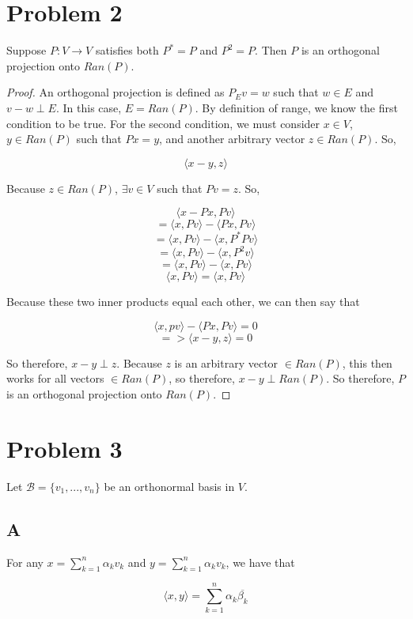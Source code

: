 \documentclass{article}
\begin{document}
\section*{Problem 2}
Suppose $P: V \rightarrow V$ satisfies both $P^* = P$ and $P^2 = P$. Then $P$ is an orthogonal projection onto $Ran(P)$.
\begin{proof}
An orthogonal projection is defined as $P_Ev = w$ such that $w \in E$ and $v-w \perp E$. In this case, $E = Ran(P)$. By definition of range, we know the first condition to be true. For the second condition, we must consider $x \in V$, $y \in Ran(P)$ such that $Px = y$, and another arbitrary vector $z \in Ran(P)$. So, 

\[ \langle x - y, z \rangle \]

Because $z \in Ran(P)$, $\exists v \in V$ such that $Pv = z$. So,

\[ \langle x - Px, Pv \rangle \]
\[ = \langle x, Pv \rangle - \langle Px, Pv \rangle \]
\[ = \langle x, Pv \rangle - \langle x, P^*Pv \rangle \]
\[ = \langle x, Pv \rangle - \langle x, P^2v \rangle \]
\[ = \langle x, Pv \rangle - \langle x, Pv \rangle \]
\[ \langle x, Pv \rangle = \langle x, Pv \rangle  \]

Because these two inner products equal each other, we can then say that

\[ \langle x, pv \rangle - \langle Px, Pv \rangle = 0 \]
\[ => \langle x - y, z \rangle = 0 \]

So therefore, $x - y \perp z$. Because $z$ is an arbitrary vector $\in Ran(P)$, this then works for all vectors $\in Ran(P)$, so therefore, $x - y \perp Ran(P)$. So therefore, $P$ is an orthogonal projection onto $Ran(P)$. 

\end{proof}

\section*{Problem 3}
Let $\mathcal{B} = \{v_1, ..., v_n\}$ be an orthonormal basis in $V$.
\subsection*{A}
For any $x = \sum_{k=1}^{n}\alpha_k v_k$ and $y = \sum_{k=1}^{n}\alpha_k v_k$, we have that

\[ \langle x, y \rangle = \sum_{k=1}^{n} \alpha_k \overline{\beta_k} \]
\end{document}

